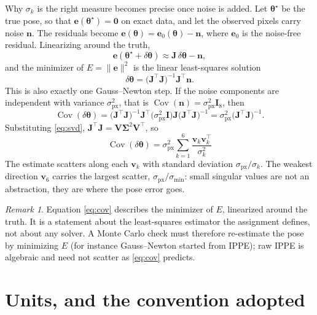 \documentclass[11pt,a4paper]{article}
\theoremstyle{remark}
\newtheorem*{remark}{Remark}
\newcommand{\Jmat}{\mathbf{J}}
\newcommand{\Vmat}{\mathbf{V}}
\newcommand{\Sigmat}{\boldsymbol{\Sigma}}
\newcommand{\Idm}{\mathbf{I}}
\newcommand{\evec}{\mathbf{e}}
\newcommand{\nvec}{\mathbf{n}}
\newcommand{\vvec}{\mathbf{v}}
\newcommand{\zerovec}{\mathbf{0}}
\newcommand{\thetavec}{\boldsymbol{\theta}}
\newcommand{\dth}{\delta\boldsymbol{\theta}}
\newcommand{\Cov}{\operatorname{Cov}}
\begin{document}
Why $\sigma_k$ is the right measure becomes precise once noise is added. Let
$\thetavec^\star$ be the true pose, so that $\evec(\thetavec^\star) =
\zerovec$ on exact data, and let the observed pixels carry noise $\nvec$. The
residuals become $\evec(\thetavec) = \evec_0(\thetavec) - \nvec$, where
$\evec_0$ is the noise-free residual. Linearizing around the truth,
\begin{equation}
  \evec(\thetavec^\star + \dth) \approx \Jmat\,\dth - \nvec ,
\end{equation}
and the minimizer of $E = \|\evec\|^2$ is the linear least-squares solution
\begin{equation}
  \dth = \big(\Jmat^{\top}\Jmat\big)^{-1}\Jmat^{\top}\nvec .
  \label{eq:gn}
\end{equation}
This is also exactly one Gauss--Newton step. If the noise components are
independent with variance $\sigma_{\mathrm{px}}^2$, that is
$\Cov(\nvec) = \sigma_{\mathrm{px}}^2\Idm_8$, then
\begin{equation}
  \Cov(\dth)
  = \big(\Jmat^{\top}\Jmat\big)^{-1}\Jmat^{\top}
    \big(\sigma_{\mathrm{px}}^2\Idm\big)
    \Jmat\big(\Jmat^{\top}\Jmat\big)^{-1}
  = \sigma_{\mathrm{px}}^2\big(\Jmat^{\top}\Jmat\big)^{-1}.
  \label{eq:cov}
\end{equation}
Substituting \eqref{eq:svd}, $\Jmat^{\top}\Jmat = \Vmat\Sigmat^2\Vmat^{\top}$,
so
\begin{equation}
  \boxed{\;
  \Cov(\dth) = \sigma_{\mathrm{px}}^2 \sum_{k=1}^{6}
    \frac{\vvec_k\vvec_k^{\top}}{\sigma_k^2}
  \;}
  \label{eq:covsvd}
\end{equation}
The estimate scatters along each $\vvec_k$ with standard deviation
$\sigma_{\mathrm{px}}/\sigma_k$. The weakest direction $\vvec_6$ carries the
largest scatter, $\sigma_{\mathrm{px}}/\sigma_{\min}$: small singular values are
not an abstraction, they are where the pose error goes.

\begin{remark}
Equation \eqref{eq:cov} describes the minimizer of $E$, linearized around the
truth. It is a statement about the least-squares estimator the assignment
defines, not about any solver. A Monte Carlo check must therefore re-estimate
the pose by minimizing $E$ (for instance Gauss--Newton started from IPPE); raw
IPPE is algebraic and need not scatter as \eqref{eq:cov} predicts.
\end{remark}

\section{Units, and the convention adopted}
\label{sec:units}
\end{document}
